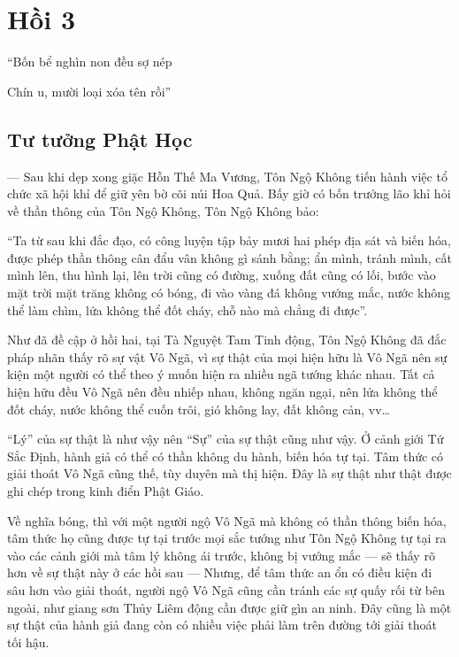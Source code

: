 \chapter{Hồi 3} %
\label{cha:hoi_3}

\begin{itshape}
``Bốn bể nghìn non đều sợ nép

Chín u, mười loại xóa tên rồi''
\end{itshape}

\section{Tư tưởng Phật Học} %
\label{sec:3_phat_hoc}

— Sau khi dẹp xong giặc Hỗn Thế Ma Vương, Tôn Ngộ Không tiến hành việc tổ chức xã hội khỉ để giữ yên bờ cõi núi Hoa Quả. Bấy giờ có bốn trưởng lão khỉ hỏi về thần thông của Tôn Ngộ Không, Tôn Ngộ Không bảo:

``Ta từ sau khi đắc đạo, có công luyện tập bảy mươi hai phép địa sát và biến hóa, được phép thần thông cân đẩu vân không gì sánh bằng; ẩn mình, tránh mình, cất mình lên, thu hình lại, lên trời cũng có đường, xuống đất cũng có lối, bước vào mặt trời mặt trăng không có bóng, đi vào vàng đá không vướng mắc, nước không thể làm chìm, lửa không thể đốt cháy, chỗ nào mà chẳng đi được''.

Như đã đề cập ở hồi hai, tại Tà Nguyệt Tam Tinh động, Tôn Ngộ Không đã đắc pháp nhãn thấy rõ sự vật Vô Ngã, vì sự thật của mọi hiện hữu là Vô Ngã nên sự kiện một người có thể theo ý muốn hiện ra nhiều ngã tướng khác nhau. Tất cả hiện hữu đều Vô Ngã nên đều nhiếp nhau, không ngăn ngại, nên lửa không thể đốt cháy, nước không thể cuốn trôi, gió không lay, đất không cản, vv\ldots

``Lý'' của sự thật là như vậy nên ``Sự'' của sự thật cũng như vậy. Ở cảnh giới Tứ Sắc Định, hành giả có thể có thần không du hành, biến hóa tự tại. Tâm thức có giải thoát Vô Ngã cũng thế, tùy duyên mà thị hiện. Đây là sự thật như thật được ghi chép trong kinh điển Phật Giáo.

Về nghĩa bóng, thì với một người ngộ Vô Ngã mà không có thần thông biến hóa, tâm thức họ cũng được tự tại trước mọi sắc tướng như Tôn Ngộ Không tự tại ra vào các cảnh giới mà tâm lý không ái trước, không bị vướng mắc — sẽ thấy rõ hơn về sự thật này ở các hồi sau — Nhưng, để tâm thức an ổn có điều kiện đi sâu hơn vào giải thoát, người ngộ Vô Ngã cũng cần tránh các sự quấy rối từ bên ngoài, như giang sơn Thủy Liêm động cần được giữ gìn an ninh. Đây cũng là một sự thật của hành giả đang còn có nhiều việc phải làm trên đường tới giải thoát tối hậu.

